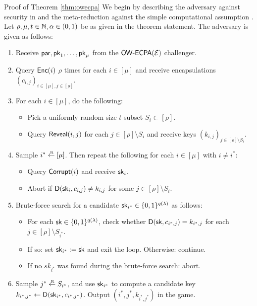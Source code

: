 \begin{namedproof}{Proof of Theorem \ref{thm:owecpa}}
  We begin by describing the adversary \advA against \OWECPA security in \KEM
  and the meta-reduction \redM against the simple computational assumption \Simple.
  Let \(\rho, \mu, t \in \mathbb{N}, \alpha \in (0,1)\) be as given in the theorem statement.
  The adversary \advA is given as follows:

  \begin{enumerate}[itemsep=0.1cm]
    \item\label{advA:init} Receive \(\mathsf{par}, \mathsf{pk}_{1}, \ldots, \mathsf{pk}_{\mu}\) from the \(\mathsf{OW}\text{-}\mathsf{ECPA}(\mathcal{E})\) challenger.
    \item\label{advA:query} Query \(\mathsf{Enc}(i)\) \(\rho\) times for each \(i \in [\mu]\) and receive encapsulations \((c_{i,j})_{i \in [\mu], j \in [\rho]}\).
    \item\label{advA:reveal} For each \(i \in [\mu]\), do the following:
          \begin{itemize}[label={\textbullet},itemsep=0.1cm]
            \item Pick a uniformly random size \(t\) subset \(S_{i} \subset [\rho]\).
            \item Query \(\mathsf{Reveal}(i,j)\) for each \(j \in [\rho] \setminus S_{i}\)
                  and receive keys \((k_{i,j})_{j \in [\rho] \setminus S_{i}}\).
          \end{itemize}
    \item\label{advA:corrupt} Sample \(i^{*} \sampleR [\mu]\). Then repeat the following for each \(i \in [\mu]\) with \(i \ne i^{*}\):
          \begin{itemize}[label={\textbullet},itemsep=0.1cm]
            \item Query \(\mathsf{Corrupt}(i)\) and receive \(\mathsf{sk}_{i}\).
            \item Abort if \(\mathsf{D}(\mathsf{sk}_{i},c_{i,j}) \ne k_{i,j}\) for some \(j \in [\rho] \setminus S_{i}\).
          \end{itemize}
     \item\label{advA:brute} Brute-force search for a candidate \(\mathsf{sk}_{i^{*}} \in \{0,1\}^{q(\lambda)}\) as follows:
          \begin{itemize}[label={\textbullet},itemsep=0.1cm]
            \item For each \(\mathsf{sk} \in \{0,1\}^{q(\lambda)}\),
                  check whether \(\mathsf{D}(\mathsf{sk},c_{i^{*},j}) = k_{i^{*},j}\) for each \(j \in [\rho] \setminus S_{i^{*}}\).
            \item If so: set \(\mathsf{sk}_{i^{*}} := \mathsf{sk}\) and exit the loop. Otherwise: continue.
            \item If no \(sk_{i^{*}}\) was found during the brute-force search: abort.
          \end{itemize}
    \item\label{advA:final} Sample \(j^{*} \sampleR S_{i^{*}}\),
          and use \(\mathsf{sk}_{i^{*}}\) to compute a candidate key \(k_{i^{*}, j^{*}} \leftarrow \mathsf{D}(\mathsf{sk}_{i^{*}},c_{i^{*}, j^{*}})\).
          Output \((i^{*}, j^{*}, k_{i^{*}, j^{*}})\) in the \OWECPA game.
  \end{enumerate}


\end{namedproof}
